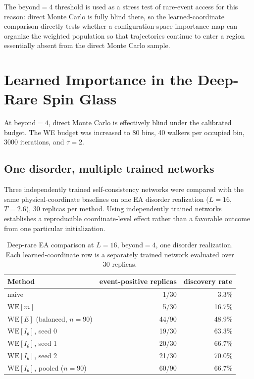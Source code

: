 \documentclass[a4paper,fleqn]{cas-sc}
\newcommand{\WE}{\mathrm{WE}}
\begin{document}
The beyond$=4$ threshold is used as a stress test of rare-event access for this reason: direct
Monte Carlo is fully blind there, so the learned-coordinate comparison directly tests whether a
configuration-space importance map can organize the weighted population so that trajectories
continue to enter a region essentially absent from the direct Monte Carlo sample.

\FloatBarrier

\section{Learned Importance in the Deep-Rare Spin Glass}\label{sec:deep}

At beyond$=4$, direct Monte Carlo is effectively blind under the calibrated budget. The WE
budget was increased to 80 bins, 40 walkers per occupied bin, 3000 iterations, and $\tau=2$.

\subsection{One disorder, multiple trained networks}\label{sec:deepwithin}
Three independently trained self-consistency networks were compared with the same
physical-coordinate baselines on one EA disorder realization ($L=16$, $T=2.6$), $30$ replicas
per method. Using independently trained networks establishes a reproducible coordinate-level
effect rather than a favorable outcome from one particular initialization.

\begin{table}[H]
\centering\small
\caption{Deep-rare EA comparison at $L=16$, beyond$=4$, one disorder realization. Each
learned-coordinate row is a separately trained network evaluated over 30 replicas.}
\label{tab:deep}
\begin{tabular}{lrr}
\toprule
Method & event-positive replicas & discovery rate \\
\midrule
naive & 1/30 & 3.3\% \\
$\WE[m]$ & 5/30 & 16.7\% \\
$\WE[E]$ (balanced, $n=90$) & 44/90 & 48.9\% \\
$\WE[I_\theta]$, seed 0 & 19/30 & 63.3\% \\
$\WE[I_\theta]$, seed 1 & 20/30 & 66.7\% \\
$\WE[I_\theta]$, seed 2 & 21/30 & 70.0\% \\
$\WE[I_\theta]$, pooled ($n=90$) & 60/90 & 66.7\% \\
\bottomrule
\end{tabular}
\end{table}
\end{document}
